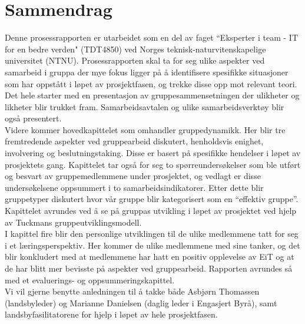 \section*{Sammendrag}

Denne prosessrapporten er utarbeidet som en del av faget ``Eksperter i team - IT for en bedre verden" (TDT4850) ved Norges teknisk-naturvitenskapelige universitet (NTNU). Prosessrapporten skal ta for seg ulike aspekter ved samarbeid i gruppa der mye fokus ligger på å identifisere spesifikke situasjoner som har oppstått i løpet av prosjektfasen, og trekke disse opp mot relevant teori. Det hele starter med en presentasjon av gruppesammensetningen der ulikheter og likheter blir trukket fram. Samarbeidsavtalen og ulike samarbeidsverktøy blir også presentert.\\

Videre kommer hovedkapittelet som omhandler gruppedynamikk. Her blir tre fremtredende aspekter ved gruppearbeid diskutert, henholdsvis enighet, involvering og beslutningstaking. Disse er basert på spesifikke hendelser i løpet av prosjektets gang. Kapittelet tar også for seg to spørreundersøkelser som ble utført og besvart av gruppemedlemmene under prosjektet, og vedlagt er disse undersøkelsene oppsummert i to samarbeidsindikatorer. Etter dette blir gruppetyper diskutert hvor vår gruppe blir kategorisert som en “effektiv gruppe”. Kapittelet avrundes ved å se på gruppas utvikling i løpet av prosjektet ved hjelp av Tuckmans gruppeutviklingsmodell.\\

I kapittel fire blir den personlige utviklingen til de ulike medlemmene tatt for seg i et læringsperspektiv. Her kommer de ulike medlemmene med sine tanker, og det blir konkludert med at medlemmene har hatt en positiv opplevelse av EiT og at de har blitt mer bevisste på aspekter ved gruppearbeid. Rapporten avrundes så med et evaluerings- og oppsummeringskapittel.\\

Vi vil gjerne benytte anledningen til å takke både Asbjørn Thomassen (landsbyleder) og Marianne Danielsen (daglig leder i Engasjert Byrå), samt landsbyfasilitatorene for hjelp i løpet av hele prosjektfasen.
